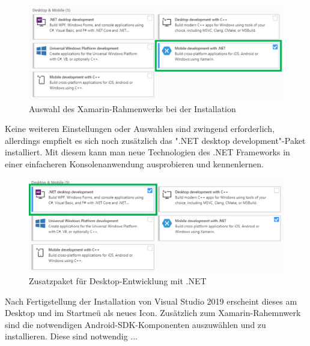 




\begin{figure}[H]
    \centering\includegraphics[width=0.7\linewidth]{images/auswahl_rahmenwerk/installation.png}    
    \caption{Auswahl des Xamarin-Rahmenwerks bei der Installation}
\end{figure}
Keine weiteren Einstellungen oder Auswahlen sind zwingend erforderlich, allerdings empfielt es sich noch zusätzlich das ".NET desktop development"-Paket installiert. Mit diesem kann man neue Technologien des .NET Frameworks in einer einfacheren Konsolenanwendung ausprobieren und kennenlernen.
\begin{figure}[H]
    \centering\includegraphics[width=0.7\linewidth]{images/auswahl_rahmenwerk/installation2.png}    
    \caption{Zusatzpaket für Desktop-Entwicklung mit .NET}
\end{figure}
Nach Fertigstellung der Installation von Visual Studio 2019 erscheint dieses am Desktop und im Startmeü als neues Icon. Zusätzlich zum Xamarin-Rahemnwerk sind die notwendigen Android-SDK-Komponenten auszuwählen und zu installieren. Diese sind notwendig ...

